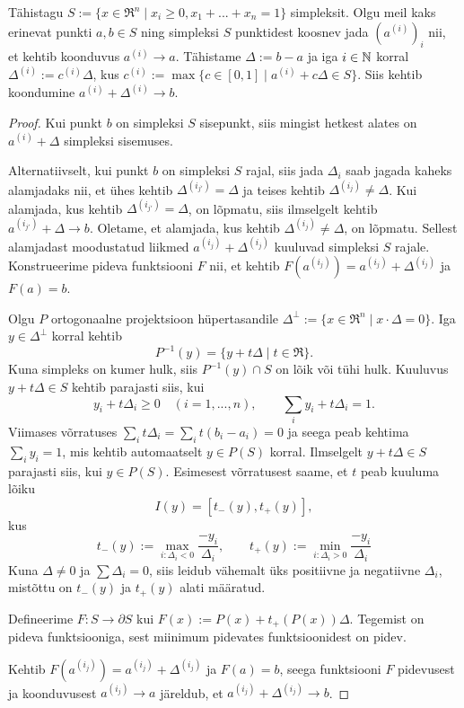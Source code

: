 \begin{lemma}
\label{lemma:simplex_convergence}
    Tähistagu $S:=\{x\in\Re^n \mid x_i \geq 0, x_1+...+x_n= 1\}$ simpleksit. Olgu meil kaks erinevat punkti $a,b\in S$ ning simpleksi $S$ punktidest koosnev jada $(a^{(i)})_i$ nii, et kehtib koonduvus $a^{(i)}\to a$. Tähistame $\Delta:=b-a$ ja iga $i\in\mathbb{N}$ korral $\Delta^{(i)} := c^{(i)} \Delta$, kus $c^{(i)} := \max\{ c\in[0,1] \mid a^{(i)} + c\Delta \in S\}$. Siis kehtib koondumine $a^{(i)}+\Delta^{(i)}\to b$. 
\end{lemma}
\begin{proof}
    Kui punkt $b$ on simpleksi $S$ sisepunkt, siis mingist hetkest alates on $a^{(i)}+\Delta$ simpleksi sisemuses.

    Alternatiivselt, kui punkt $b$ on simpleksi $S$ rajal, siis jada $\Delta_i$ saab jagada kaheks alamjadaks nii, et ühes kehtib $\Delta^{(i_{j'})}=\Delta$ ja teises kehtib $\Delta^{(i_j)}\neq\Delta$. Kui alamjada, kus kehtib $\Delta^{(i_{j'})}=\Delta$, on lõpmatu, siis ilmselgelt kehtib $a^{(i_{j'})}+\Delta \to b$. Oletame, et alamjada, kus kehtib $\Delta^{(i_j)}\neq\Delta$, on lõpmatu. Sellest alamjadast moodustatud liikmed $a^{(i_j)}+\Delta^{(i_j)}$ kuuluvad simpleksi $S$ rajale. Konstrueerime pideva funktsiooni $F$ nii, et kehtib $F(a^{(i_j)})=a^{(i_j)}+\Delta^{(i_j)}$ ja $F(a)=b$.

    Olgu $P$ ortogonaalne projektsioon hüpertasandile $\Delta^\perp := \{x \in \Re^n \mid x\cdot\Delta = 0\}$. Iga $y\in \Delta^\perp$ korral kehtib
    \[
    P^{-1}(y)=\{y+t\Delta \mid t\in\Re\}.
    \]
    Kuna simpleks on kumer hulk, siis $P^{-1}(y)\cap S$ on lõik või tühi hulk. Kuuluvus $y+t\Delta\in S$ kehtib parajasti siis, kui
    \[
    y_i + t\Delta_i \geq 0 \quad (i=1,...,n), \qquad \sum_i y_i + t \Delta_i = 1.
    \]
    Viimases võrratuses $\sum_i t\Delta_i = \sum_i t(b_i-a_i)=0 $ ja seega peab kehtima $\sum_i y_i = 1$, mis kehtib automaatselt $y\in P(S)$ korral. Ilmselgelt $y+t\Delta\in S$ parajasti siis, kui $y\in P(S)$. Esimesest võrratusest saame, et $t$ peab kuuluma lõiku
    \[
    I(y)=[t_-(y),t_+(y)],
    \]
    kus
    \[
    t_-(y):=\max_{i:\Delta_i<0} \frac{-y_i}{\Delta_i}, \qquad
    t_+(y):=\min_{i:\Delta_i>0} \frac{-y_i}{\Delta_i}
    \]
    Kuna $\Delta\neq 0$ ja $\sum \Delta_i = 0$, siis leidub vähemalt üks positiivne ja negatiivne $\Delta_i$, mistõttu on $t_-(y)$ ja $t_+(y)$ alati määratud.

    Defineerime $F:S\to\partial S$ kui $F(x):=P(x)+t_+(P(x))\Delta$. Tegemist on pideva funktsiooniga, sest miinimum pidevates funktsioonidest on pidev.

    Kehtib $F(a^{(i_j)})=a^{(i_j)}+\Delta^{(i_j)}$ ja $F(a)=b$, seega funktsiooni $F$ pidevusest ja koonduvusest $a^{(i_j)}\to a$ järeldub, et $a^{(i_j)}+\Delta^{(i_j)}\to b$.
\end{proof}


